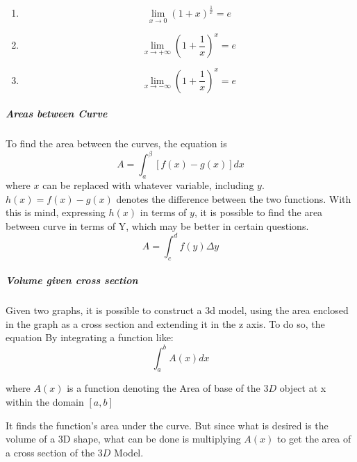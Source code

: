 \documentclass{article} %
\theoremstyle{theorem}
\theoremstyle{definition}
\begin{document}
                    \begin{enumerate}[label=(\alph*)]
                        \item \begin{equation} \lim_{x\rightarrow0}(1+x)^{\frac{1}{x}}=e \end{equation}
                        \item \begin{equation} \lim_{x\rightarrow +\infty}(1+\frac{1}{x})^x=e \end{equation}
                        \item \begin{equation} \lim_{x\rightarrow -\infty}(1+\frac{1}{x})^x=e \end{equation}
                    \end{enumerate}
                \subparagraph{Areas between Curve}
                    To find the area between the curves, the equation is \begin{equation}
                        A=\int_{a}^{\beta}[f(x)-g(x)]dx
                        \label{eq:AreaBtCurve}
                    \end{equation}
                    where $x$ can be replaced with whatever variable, including $y$. $h(x) = f(x) - g(x)$ denotes the difference between the two functions. With this is mind, expressing $h(x)$ in terms of $y$, it is possible to find the area between curve in terms of Y, which may be better in certain questions. 
                    \begin{equation}
                        A = \int_{c}^{d}f(y)\Delta y
                        \label{eq:ABtwnCurvdy}
                    \end{equation}
                \subparagraph{Volume given cross section}
                    Given two graphs, it is possible to construct a 3d model, using the area enclosed in the graph as a cross section and extending it in the z axis. To do so, the equation %
                    By integrating a function like: $$\int^b_a A(x)dx$$
                    \begin{center} where $A(x)$ is a function denoting the Area of base of the $3D$ object at x within the domain $[a,b]$ \end{center}
                    It finds the function's area under the curve. But since what is desired is the volume of a 3D shape, what can be done
                    is multiplying $A(x)$ to get the area of a cross section of the $3D$ Model. 
\end{document}
